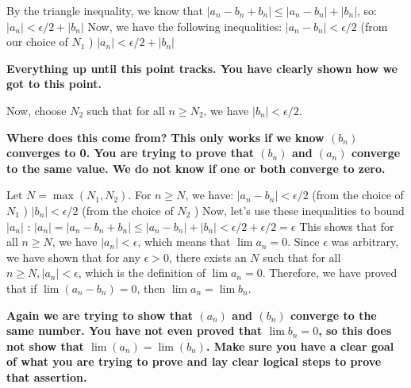 \documentclass{report}
\begin{document}
By the triangle inequality, we know that $\left|a_n-b_n+b_n\right| \leq\left|a_n-b_n\right|+\left|b_n\right|$, so: $\left|a_n\right|<\epsilon / 2+\left|b_n\right|$ Now, we have the following inequalities: $\left|a_n-b_n\right|<\epsilon / 2$ (from our choice of $N_1$ )
$\left|a_n\right|<\epsilon / 2+\left|b_n\right|$
\par
\textbf{Everything up until this point tracks. You have clearly shown how we got to this point.}
\par
Now, choose $N_2$ such that for all $n \geq N_2$, we have $\left|b_n\right|<\epsilon / 2$. 
\par
\textbf{Where does this come from? This only works if we know $(b_n)$ converges to 0. You are trying to prove that $(b_n)$ and $(a_n)$ converge to the same value. We do not know if one or both converge to zero.}

Let $N=\max \left(N_1, N_2\right)$. For $n \geq N$, we have: $\left|a_n-b_n\right|<\epsilon / 2$ (from the choice of $N_1$ )
$\left|b_n\right|<\epsilon / 2$ (from the choice of $N_2$ )
Now, let's use these inequalities to bound $\left|a_n\right|$ :
$\left|a_n\right|=\left|a_n-b_n+b_n\right| \leq\left|a_n-b_n\right|+\left|b_n\right|<\epsilon / 2+\epsilon / 2=\epsilon$
This shows that for all $n \geq N$, we have $\left|a_n\right|<\epsilon$, which means that $\lim a_n=0$.
Since $\epsilon$ was arbitrary, we have shown that for any $\epsilon>0$, there exists an $N$ such that for all $n \geq N,\left|a_n\right|<\epsilon$, which is the definition of $\lim a_n=0$.
Therefore, we have proved that if $\lim \left(a_n-b_n\right)=0$, then $\lim a_n=\lim b_n$.
\par
\textbf{Again we are trying to show that $(a_n)$ and $(b_n)$ converge to the same number. You have not even proved that $\lim b_n = 0$, so this does not show that $\lim (a_n) = \lim (b_n)$. Make sure you have a clear goal of what you are trying to prove and lay clear logical steps to prove that assertion.}
\end{document}
